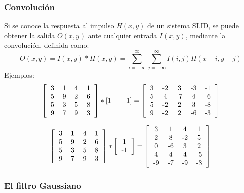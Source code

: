 \begin{frame}\frametitle{Convolución}
  Si se conoce la respuesta al impulso $H(x,y)$ de un sistema SLID, se puede obtener la salida $O(x,y)$ ante cualquier entrada $I(x,y)$, mediante la convolución, definida como:
  \[O(x,y) = I(x,y)*H(x,y) = \sum_{i=-\infty}^\infty \sum_{j=-\infty}^\infty I(i,j)H(x-i, y-j)\]
  Ejemplos:
  \[\left[\begin{tabular}{cccc}
      3 & 1 & 4 & 1\\
      5 & 9 & 2 & 6\\
      5 & 3 & 5 & 8\\
      9 & 7 & 9 &3
    \end{tabular}\right]* [1\quad -1] =
  \left[\begin{tabular}{ccccc}
      3 & -2 & 3 & -3 & -1\\
      5 & 4 & -7 & 4 & -6\\
      5 & -2 & 2 & 3 & -8\\
      9 & -2 & 2 & -6 & -3
    \end{tabular}\right]\]

  \[\left[\begin{tabular}{cccc}
      3 & 1 & 4 & 1\\
      5 & 9 & 2 & 6\\
      5 & 3 & 5 & 8\\
      9 & 7 & 9 &3
    \end{tabular}\right]* \left[\begin{tabular}{c}1 \\ -1\end{tabular}\right] =
  \left[\begin{tabular}{cccc}
      3 & 1 & 4 & 1\\
      2 & 8 & -2 & 5\\
      0 & -6 & 3 & 2\\
      4 & 4 & 4 & -5\\
      -9 & -7 & -9 & -3
    \end{tabular}\right]\]
\end{frame}

\begin{frame}\frametitle{El filtro Gaussiano}
\end{frame}

